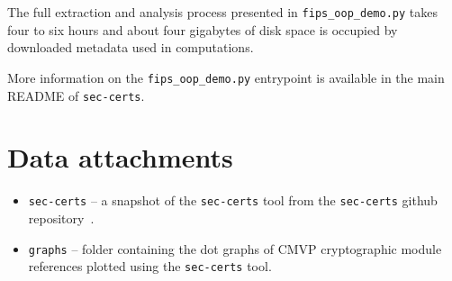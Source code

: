 The full extraction and analysis process presented in \texttt{fips\_oop\_demo.py} takes four to six hours and about four gigabytes of disk space is occupied by downloaded metadata used in computations.

More information on the \texttt{fips\_oop\_demo.py} entrypoint is available in the main README of \texttt{sec-certs}.

\renewcommand{\thechapter}{b}

\chapter{Data attachments}
\begin{itemize}
    \item \texttt{sec-certs} -- a snapshot of the \texttt{sec-certs} tool from the \texttt{sec-certs} github repository~\cite{sec-certs}.
    \item \texttt{graphs} -- folder containing the dot graphs of CMVP cryptographic module references plotted using the \texttt{sec-certs} tool.
\end{itemize}